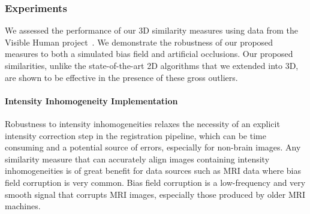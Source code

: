 \subsubsection{Experiments}\label{subsubsec:singl_img_3d_lk_experiments}
We assessed the performance of our 3D similarity measures using data from the
Visible Human project~\cite{spitzer1996visiblehuman}.
We demonstrate the robustness of our
proposed measures to both a simulated bias field and artificial occlusions. Our
proposed similarities, unlike the state-of-the-art 2D algorithms that we
extended into 3D, are shown to be effective in the presence of these gross
outliers.
\paragraph{Intensity Inhomogeneity Implementation}\label{subsubsec:bias_fields}
Robustness to intensity inhomogeneities relaxes the necessity of an explicit
intensity correction step in the registration pipeline, which can be time
consuming and a potential source of errors, especially for non-brain images. Any
similarity measure that can accurately align images containing intensity
inhomogeneities is of great benefit for data sources such as MRI data where bias
field corruption is very common. Bias field corruption is a low-frequency and
very smooth signal that corrupts MRI images, especially those produced by older
MRI machines.

